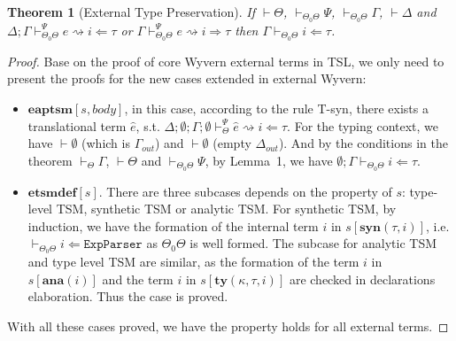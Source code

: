 \documentclass[letterpaper, notitlepage]{article}
\newtheorem{theorem}{Theorem}
\begin{document}
\begin{theorem}[External Type Preservation]
If $\vdash\Theta$, $\vdash_{\Theta_0\Theta}\Psi$, $\vdash_{\Theta_0\Theta}\Gamma$, $\vdash\Delta$ and $\Delta;\Gamma\vdash_{\Theta_0\Theta}^{\Psi} e\rightsquigarrow i\Leftarrow\tau$ or $\Gamma\vdash_{\Theta_0\Theta}^{\Psi} e\rightsquigarrow i\Rightarrow\tau$ then $\Gamma\vdash_{\Theta_0\Theta} i\Leftarrow\tau$.
\end{theorem}
\begin{proof}
Base on the proof of core Wyvern external terms in TSL, we only need to present the proofs for the new cases extended in external Wyvern:
\begin{itemize}
\item $\mathbf{eaptsm}[s,body]$, in this case, according to the rule T-syn, there exists a translational term $\hat{e}$, s.t. $\Delta;\emptyset;\Gamma;\emptyset\vdash_{\Theta}^{\Psi}\hat{e}\rightsquigarrow i\Leftarrow \tau$. For the typing context, we have $\vdash\emptyset$ (which is $\Gamma_{out}$) and $\vdash\emptyset$ (empty $\Delta_{out}$). And by the conditions in the theorem $\vdash_{\Theta}\Gamma$, $\vdash\Theta$ and $\vdash_{\Theta_0\Theta}\Psi$, by Lemma~1, we have $\emptyset;\Gamma\vdash_{\Theta_0\Theta}i\Leftarrow\tau$. 
\item $\mathbf{etsmdef}[s]$. There are three subcases depends on the property of $s$: type-level TSM, synthetic TSM or analytic TSM. For synthetic TSM, by induction, we have the formation of the internal term $i$ in $s[\mathbf{syn}(\tau,i)]$, i.e. $\vdash_{\Theta_0\Theta}i\Leftarrow \mathtt{ExpParser}$ as $\Theta_0\Theta$ is well formed. The subcase for analytic TSM and type level TSM are similar, as the formation of the term $i$ in $s[\mathbf{ana}(i)]$ and the term $i$ in $s[\mathbf{ty}(\kappa,\tau,i)]$ are checked in declarations elaboration. Thus the case is proved.
\end{itemize}
With all these cases proved, we have the property holds for all external terms.
\end{proof}
\end{document}
